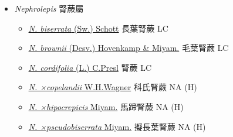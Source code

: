
  \begin{itemize}
 \item[    ] \textit{Nephrolepis} 腎蕨屬
                                
  \begin{itemize}
        \item[] \href{http://www.theplantlist.org/tpl1.1/search?q=Nephrolepis+biserrata}{\textit{N. biserrata} (Sw.) Schott}   長葉腎蕨   LC
        \item[] \href{http://www.theplantlist.org/tpl1.1/search?q=Nephrolepis+brownii}{\textit{N. brownii} (Desv.) Hovenkamp \& Miyam.}   毛葉腎蕨   LC
        \item[] \href{http://www.theplantlist.org/tpl1.1/search?q=Nephrolepis+cordifolia}{\textit{N. cordifolia} (L.) C.Presl}   腎蕨   LC
        \item[] \href{http://www.theplantlist.org/tpl1.1/search?q=Nephrolepis+×copelandii}{\textit{N. ×copelandii} W.H.Wagner}   科氏腎蕨   NA (H)
        \item[] \href{http://www.theplantlist.org/tpl1.1/search?q=Nephrolepis+×hipocrepicis}{\textit{N. ×hipocrepicis} Miyam.}   馬蹄腎蕨   NA (H)
        \item[] \href{http://www.theplantlist.org/tpl1.1/search?q=Nephrolepis+×pseudobiserrata}{\textit{N. ×pseudobiserrata} Miyam.}   擬長葉腎蕨   NA (H)
  \end{itemize}
  \end{itemize}
